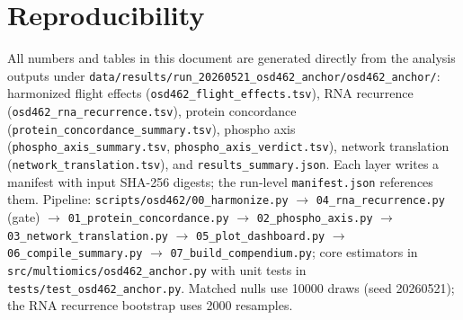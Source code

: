 \documentclass[11pt]{article}
\begin{document}
\section{Reproducibility}
All numbers and tables in this document are generated directly from the analysis outputs
under \texttt{data/results/run\_20260521\_osd462\_anchor/osd462\_anchor/}: harmonized flight effects
(\texttt{osd462\_flight\_effects.tsv}), RNA recurrence
(\texttt{osd462\_rna\_recurrence.tsv}), protein concordance
(\texttt{protein\_concordance\_summary.tsv}), phospho axis
(\texttt{phospho\_axis\_summary.tsv}, \texttt{phospho\_axis\_verdict.tsv}), network
translation (\texttt{network\_translation.tsv}), and \texttt{results\_summary.json}. Each
layer writes a manifest with input SHA-256 digests; the run-level \texttt{manifest.json}
references them. Pipeline: \texttt{scripts/osd462/00\_harmonize.py} $\to$
\texttt{04\_rna\_recurrence.py} (gate) $\to$ \texttt{01\_protein\_concordance.py} $\to$
\texttt{02\_phospho\_axis.py} $\to$ \texttt{03\_network\_translation.py} $\to$
\texttt{05\_plot\_dashboard.py} $\to$ \texttt{06\_compile\_summary.py} $\to$
\texttt{07\_build\_compendium.py}; core estimators in
\texttt{src/multiomics/osd462\_anchor.py} with unit tests in
\texttt{tests/test\_osd462\_anchor.py}. Matched nulls use 10000 draws (seed 20260521);
the RNA recurrence bootstrap uses 2000 resamples.
\end{document}
